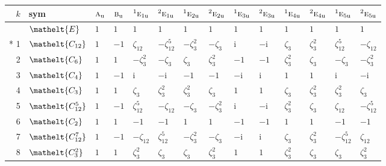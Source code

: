 \documentclass[10pt,a4paper]{article}
\numberwithin{equation}{section}
\newcommand{\eltfont}[1]{{\let\sigma\eltsigma\mathelt{#1}}}
\newcommand{\irr}[1]{\text{\normalfont\scshape #1}}
\newcommand{\conjpair}[1]{{}^{#1}}
\newcommand{\cls}[1]{\eltfont{#1}}
\newcommand{\ptag}[1]{\mathrm{#1}}
\newcommand{\iunit}{\mathrm{i}}
\newcommand{\rootunity}[1]{\zeta_{#1}}
\begin{document}
{\small\setlength{\tabcolsep}{4pt}
\begin{longtable}{@{}rlllllllllllll@{}}\toprule
$k$ & sym & $\irr{a}_{\ptag{u}}$ & $\irr{b}_{\ptag{u}}$ & $\conjpair{1}\irr{e}_{1\ptag{u}}$ & $\conjpair{2}\irr{e}_{1\ptag{u}}$ & $\conjpair{1}\irr{e}_{2\ptag{u}}$ & $\conjpair{2}\irr{e}_{2\ptag{u}}$ & $\conjpair{1}\irr{e}_{3\ptag{u}}$ & $\conjpair{2}\irr{e}_{3\ptag{u}}$ & $\conjpair{1}\irr{e}_{4\ptag{u}}$ & $\conjpair{2}\irr{e}_{4\ptag{u}}$ & $\conjpair{1}\irr{e}_{5\ptag{u}}$ & $\conjpair{2}\irr{e}_{5\ptag{u}}$\\\midrule\endhead
\bottomrule\endfoot\endlastfoot
0 & $\cls{E}$ & $1$ & $1$ & $1$ & $1$ & $1$ & $1$ & $1$ & $1$ & $1$ & $1$ & $1$ & $1$\\*
1 & $\cls{C_{12}}$ & $1$ & $-1$ & $\rootunity{12}$ & $-\rootunity{12}^{5}$ & $-\rootunity{3}^{2}$ & $-\rootunity{3}$ & $\iunit{}$ & $-\iunit{}$ & $\rootunity{3}$ & $\rootunity{3}^{2}$ & $\rootunity{12}^{5}$ & $-\rootunity{12}$\\
2 & $\cls{C_{6}}$ & $1$ & $1$ & $-\rootunity{3}^{2}$ & $-\rootunity{3}$ & $\rootunity{3}$ & $\rootunity{3}^{2}$ & $-1$ & $-1$ & $\rootunity{3}^{2}$ & $\rootunity{3}$ & $-\rootunity{3}$ & $-\rootunity{3}^{2}$\\
3 & $\cls{C_{4}}$ & $1$ & $-1$ & $\iunit{}$ & $-\iunit{}$ & $-1$ & $-1$ & $-\iunit{}$ & $\iunit{}$ & $1$ & $1$ & $\iunit{}$ & $-\iunit{}$\\
4 & $\cls{C_{3}}$ & $1$ & $1$ & $\rootunity{3}$ & $\rootunity{3}^{2}$ & $\rootunity{3}^{2}$ & $\rootunity{3}$ & $1$ & $1$ & $\rootunity{3}$ & $\rootunity{3}^{2}$ & $\rootunity{3}^{2}$ & $\rootunity{3}$\\
5 & $\cls{C_{12}^{5}}$ & $1$ & $-1$ & $\rootunity{12}^{5}$ & $-\rootunity{12}$ & $-\rootunity{3}$ & $-\rootunity{3}^{2}$ & $\iunit{}$ & $-\iunit{}$ & $\rootunity{3}^{2}$ & $\rootunity{3}$ & $\rootunity{12}$ & $-\rootunity{12}^{5}$\\
6 & $\cls{C_{2}}$ & $1$ & $1$ & $-1$ & $-1$ & $1$ & $1$ & $-1$ & $-1$ & $1$ & $1$ & $-1$ & $-1$\\
7 & $\cls{C_{12}^{7}}$ & $1$ & $-1$ & $-\rootunity{12}$ & $\rootunity{12}^{5}$ & $-\rootunity{3}^{2}$ & $-\rootunity{3}$ & $-\iunit{}$ & $\iunit{}$ & $\rootunity{3}$ & $\rootunity{3}^{2}$ & $-\rootunity{12}^{5}$ & $\rootunity{12}$\\
8 & $\cls{C_{3}^{2}}$ & $1$ & $1$ & $\rootunity{3}^{2}$ & $\rootunity{3}$ & $\rootunity{3}$ & $\rootunity{3}^{2}$ & $1$ & $1$ & $\rootunity{3}^{2}$ & $\rootunity{3}$ & $\rootunity{3}$ & $\rootunity{3}^{2}$\\

\end{longtable}}
\end{document}
